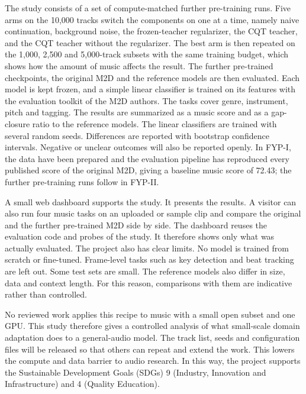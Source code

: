\documentclass{FastFyp}
\begin{document}
The study consists of a set of compute-matched further pre-training runs. Five arms on the 10,000 tracks switch the components on one at a time, namely naive continuation, background noise, the frozen-teacher regularizer, the CQT teacher, and the CQT teacher without the regularizer. The best arm is then repeated on the 1,000, 2,500 and 5,000-track subsets with the same training budget, which shows how the amount of music affects the result. The further pre-trained checkpoints, the original M2D and the reference models are then evaluated. Each model is kept frozen, and a simple linear classifier is trained on its features with the evaluation toolkit of the M2D authors. The tasks cover genre, instrument, pitch and tagging. The results are summarized as a music score and as a gap-closure ratio to the reference models. The linear classifiers are trained with several random seeds. Differences are reported with bootstrap confidence intervals. Negative or unclear outcomes will also be reported openly. In FYP-I, the data have been prepared and the evaluation pipeline has reproduced every published score of the original M2D, giving a baseline music score of 72.43; the further pre-training runs follow in FYP-II.

A small web dashboard supports the study. It presents the results. A visitor can also run four music tasks on an uploaded or sample clip and compare the original and the further pre-trained M2D side by side. The dashboard reuses the evaluation code and probes of the study. It therefore shows only what was actually evaluated. The project also has clear limits. No model is trained from scratch or fine-tuned. Frame-level tasks such as key detection and beat tracking are left out. Some test sets are small. The reference models also differ in size, data and context length. For this reason, comparisons with them are indicative rather than controlled.

No reviewed work applies this recipe to music with a small open subset and one GPU. This study therefore gives a controlled analysis of what small-scale domain adaptation does to a general-audio model. The track list, seeds and configuration files will be released so that others can repeat and extend the work. This lowers the compute and data barrier to audio research. In this way, the project supports the Sustainable Development Goals (SDGs) 9 (Industry, Innovation and Infrastructure) and 4 (Quality Education).
\pagebreak


\pagestyle{fancy} %
{\tableofcontents}
\end{document}
